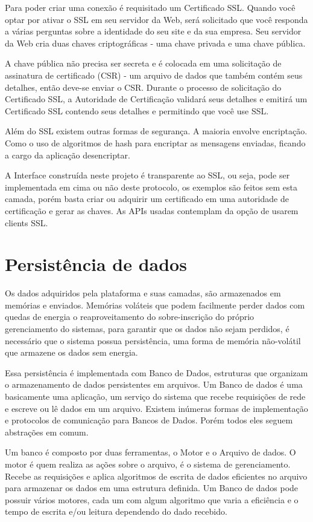 Para poder criar uma conexão é requisitado um Certificado SSL. Quando você optar por ativar o SSL em seu servidor da Web, será solicitado que você responda a várias perguntas sobre a identidade do seu site e da sua empresa. Seu servidor da Web cria duas chaves criptográficas - uma chave privada e uma chave pública.

A chave pública não precisa ser secreta e é colocada em uma solicitação de assinatura de certificado (CSR) - um arquivo de dados que também contém seus detalhes, então deve-se enviar o CSR. Durante o processo de solicitação do Certificado SSL, a Autoridade de Certificação validará seus detalhes e emitirá um Certificado SSL contendo seus detalhes e permitindo que você use SSL.

Além do SSL existem outras formas de segurança. A maioria envolve encriptação. Como o uso de algoritmos de hash para encriptar as mensagens enviadas, ficando a cargo da aplicação desencriptar.

A Interface construída neste projeto é transparente ao SSL, ou seja, pode ser implementada em cima ou não deste protocolo, os exemplos são feitos sem esta camada, porém basta criar ou adquirir um certificado em uma autoridade de certificação e gerar as chaves. As APIs usadas contemplam da opção de usarem clients SSL.


\section{Persistência de dados}
\label{section:persistencia}

Os dados adquiridos pela plataforma e suas camadas, são armazenados em memórias e enviados. Memórias voláteis que podem facilmente perder dados com quedas de energia o reaproveitamento do sobre-inscrição do próprio gerenciamento do sistemas, para garantir que os dados não sejam perdidos, é necessário que o sistema possua persistência, uma forma de memória não-volátil que armazene os dados sem energia.

Essa persistência é implementada com Banco de Dados, estruturas que organizam o armazenamento de dados persistentes em arquivos. Um Banco de dados é uma basicamente uma aplicação, um serviço do sistema que recebe requisições de rede e escreve ou lê dados em um arquivo. Existem inúmeras formas de implementação e protocolos de comunicação para Bancos de Dados. Porém todos eles seguem abstrações em comum.

Um banco é composto por duas ferramentas, o Motor e o Arquivo de dados. O motor é quem realiza as ações sobre o arquivo, é o sistema de gerenciamento. Recebe as requisições e aplica algoritmos de escrita de dados eficientes no arquivo para armazenar os dados em uma estrutura definida. Um Banco de dados pode possuir vários motores, cada um com algum algoritmo que varia a eficiência e o tempo de escrita e/ou leitura dependendo do dado recebido.

